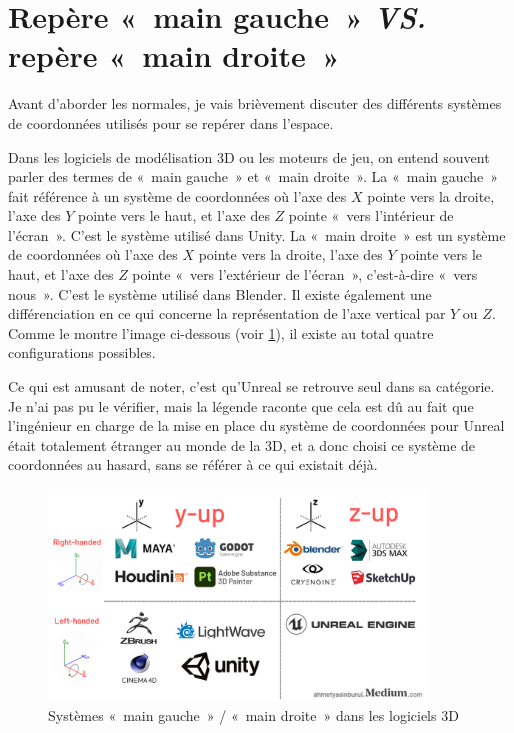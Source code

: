 \newpage
\section{Repère «~main gauche~» \textit{VS.} repère «~main droite~»}

Avant d'aborder les normales, je vais brièvement discuter des différents systèmes de coordonnées utilisés pour se repérer dans l'espace. 

Dans les logiciels de modélisation 3D ou les moteurs de jeu, on entend souvent parler des termes de «~main gauche~» et «~main droite~». La «~main gauche~» fait référence à un système de coordonnées où l'axe des $X$ pointe vers la droite, l'axe des $Y$ pointe vers le haut, et l'axe des $Z$ pointe «~vers l'intérieur de l'écran~». C'est le système utilisé dans Unity. La «~main droite~» est un système de coordonnées où l'axe des $X$ pointe vers la droite, l'axe des $Y$ pointe vers le haut, et l'axe des $Z$ pointe «~vers l'extérieur de l'écran~», c'est-à-dire «~vers nous~». C'est le système utilisé dans Blender. Il existe également une différenciation en ce qui concerne la représentation de l'axe vertical par $Y$ ou $Z$. Comme le montre l'image ci-dessous (voir \ref{lr_handed}), il existe au total quatre configurations possibles. 

Ce qui est amusant de noter, c'est qu'Unreal se retrouve seul dans sa catégorie. Je n'ai pas pu le vérifier, mais la légende raconte que cela est dû au fait que l'ingénieur en charge de la mise en place du système de coordonnées pour Unreal était totalement étranger au monde de la 3D, et a donc choisi ce système de coordonnées au hasard, sans se référer à ce qui existait déjà.

\begin{figure}[h]
    \begin{center}
    \includegraphics[width=10cm]{images/shaders/lr_handed.png}
    \end{center}
    \caption{Systèmes «~main gauche~» / «~main droite~» dans les logiciels 3D}
    \label{lr_handed}
\end{figure}


